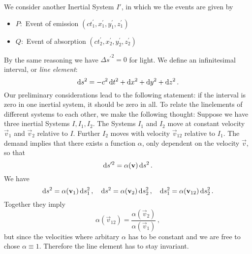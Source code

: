 We consider another Inertial System $I'$, in which we the events are given by
\begin{itemize}
    \item $P:$ Event of emission $(ct_1^\prime,x_1^\prime,y_1^\prime,z_1^\prime)$
    \item $Q:$ Event of absorption
    $(ct_2^\prime,x_2^\prime,y_2^\prime,z_2^\prime)$
\end{itemize}
By the same reasoning we have ${\Delta s^\prime}^2=0$ for light.
We define an infinitesimal interval, or \emph{line element}:
\begin{equation}
    \dif s^2=-c^2\dif t^2+\dif x^2+\dif y^2+\dif z^2\, .
\end{equation}
Our preliminary considerations lead to the following statement: if the interval
is zero in one inertial system, it should be zero in all.
To relate the linelements of different systems to each other, we make the following thought:
Suppose we have three inertial Systems $I,I_1,I_2$.
The Systems $I_1$ and $I_2$ move at constant velocity $\vec{v}_1$ and $\vec{v}_2$ relative to $I$. Further
$I_2$ moves with velocity $\vec{v}_{12}$ relative to $I_1$. The demand implies
that there exists a function $\alpha$, only dependent on the velocity $\vec{v}$,
so that
\begin{equation}
    \dif s'^2=\alpha(\vec{v})\dif s^2\, .
\end{equation}
We have
\begin{equation}
    \dif s^2=\alpha(\vec{v}_1)\dif s_1^2\, ,\quad\dif s^2=\alpha(\vec{v}_2)\dif
    s_2^2\, ,\quad\dif s_1^2=\alpha(\vec{v}_{12})\dif s_2^2\, .
\end{equation}
Together they imply
\begin{equation}
    \alpha(\vec{v}_{12})=\frac{\alpha(\vec{v}_{2})}{\alpha(\vec{v}_{1})}\, ,
\end{equation}
but since the velocities where arbitary $\alpha$ has to be constant and we are
free to chose $\alpha\equiv 1$. Therefore the line element has to stay
invariant.
